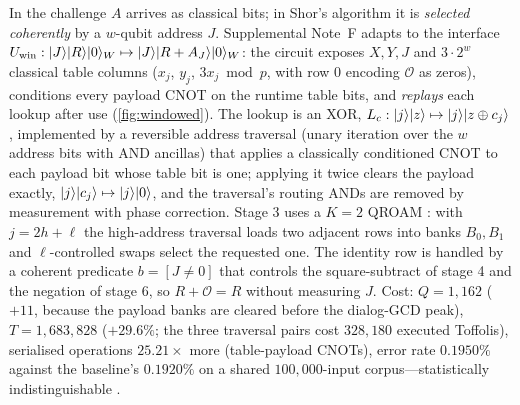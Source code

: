 In the challenge $A$ arrives as classical bits; in Shor's algorithm it is \emph{selected coherently} by a $w$-qubit address $J$. Supplemental Note~F adapts  to the interface $U_{\rm win}:\lvert J \rangle\lvert R \rangle\lvert 0 \rangle_W\mapsto\lvert J \rangle\lvert R+A_J \rangle\lvert 0 \rangle_W$: the circuit exposes $X,Y,J$ and $3\cdot2^{w}$ classical table columns ($x_j$, $y_j$, $3x_j\bmod p$, with row $0$ encoding $\mathcal O$ as zeros), conditions every payload CNOT on the runtime table bits, and \emph{replays} each lookup after use (\cref{fig:windowed}). The lookup is an XOR, $L_c:\lvert j \rangle\lvert z \rangle\mapsto\lvert j \rangle\lvert z\oplus c_j \rangle$, implemented by a reversible address traversal (unary iteration over the $w$ address bits with AND ancillas) that applies a classically conditioned CNOT to each payload bit whose table bit is one; applying it twice clears the payload exactly, $\lvert j \rangle\lvert c_j \rangle\mapsto\lvert j \rangle\lvert 0 \rangle$, and the traversal's routing ANDs are removed by measurement with phase correction. Stage 3 uses a $K=2$ QROAM \cite{lks18}: with $j=2h+\ell$ the high-address traversal loads two adjacent rows into banks $B_0,B_1$ and $\ell$-controlled swaps select the requested one. The identity row is handled by a coherent predicate $b=[J\ne0]$ that controls the square-subtract of stage 4 and the negation of stage 6, so $R+\mathcal O=R$ without measuring $J$. Cost: $Q=1{,}162$ ($+11$, because the payload banks are cleared before the dialog-GCD peak), $T=1{,}683{,}828$ ($+29.6\%$; the three traversal pairs cost $328{,}180$ executed Toffolis), serialised operations $25.21\times$ more (table-payload CNOTs), error rate $0.1950\%$ against the baseline's $0.1920\%$ on a shared $100{,}000$-input corpus---statistically indistinguishable \cite{ecdsafail-supp}.

